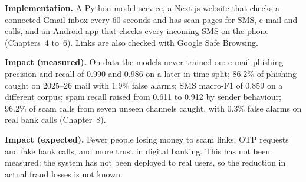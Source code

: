 \vspace{0.2cm}
\noindent\textbf{Implementation.} A Python model service, a Next.js website that checks a connected Gmail inbox every 60 seconds and has scan pages for SMS, e-mail and calls, and an Android app that checks every incoming SMS on the phone (Chapters~4 to~6). Links are also checked with Google Safe Browsing.

\vspace{0.2cm}
\noindent\textbf{Impact (measured).} On data the models never trained on: e-mail phishing precision and recall of 0.990 and 0.986 on a later-in-time split; 86.2\% of phishing caught on 2025--26 mail with 1.9\% false alarms; SMS macro-F1 of 0.859 on a different corpus; spam recall raised from 0.611 to 0.912 by sender behaviour; 96.2\% of scam calls from seven unseen channels caught, with 0.3\% false alarms on real bank calls (Chapter~8).

\vspace{0.2cm}
\noindent\textbf{Impact (expected).} Fewer people losing money to scam links, OTP requests and fake bank calls, and more trust in digital banking. This has not been measured: the system has not been deployed to real users, so the reduction in actual fraud losses is not known.
